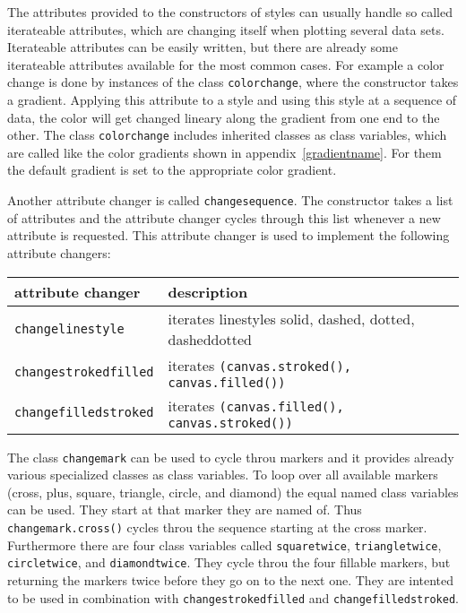 The attributes provided to the constructors of styles can usually
handle so called iterateable attributes, which are changing itself
when plotting several data sets. Iterateable attributes can be easily
written, but there are already some iterateable attributes available
for the most common cases. For example a color change is done by
instances of the class \verb|colorchange|, where the constructor takes
a gradient. Applying this attribute to a style and using this style at
a sequence of data, the color will get changed lineary along the
gradient from one end to the other. The class \verb|colorchange|
includes inherited classes as class variables, which are called like
the color gradients shown in appendix~\ref{gradientname}. For them the
default gradient is set to the appropriate color gradient.

Another attribute changer is called \verb|changesequence|. The
constructor takes a list of attributes and the attribute changer
cycles through this list whenever a new attribute is requested.
This attribute changer is used to implement the following attribute
changers:

\begin{center}
\begin{tabular}{ll}
attribute changer&description\\
\hline
\texttt{changelinestyle}&iterates linestyles solid, dashed, dotted, dasheddotted\\
\texttt{changestrokedfilled}&iterates \texttt{(canvas.stroked(), canvas.filled())}\\
\texttt{changefilledstroked}&iterates \texttt{(canvas.filled(), canvas.stroked())}\\
\end{tabular}
\end{center}

The class \verb|changemark| can be used to cycle throu markers and it
provides already various specialized classes as class variables. To
loop over all available markers (cross, plus, square, triangle,
circle, and diamond) the equal named class variables can be used. They
start at that marker they are named of. Thus \verb|changemark.cross()|
cycles throu the sequence starting at the cross marker. Furthermore
there are four class variables called \verb|squaretwice|,
\verb|triangletwice|, \verb|circletwice|, and \verb|diamondtwice|.
They cycle throu the four fillable markers, but returning the markers
twice before they go on to the next one. They are intented to be used
in combination with \verb|changestrokedfilled| and
\verb|changefilledstroked|.

